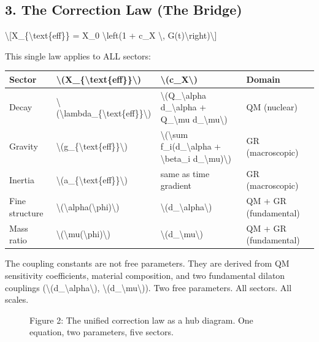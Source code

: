 \documentclass[
  10pt,
]{article}
\begin{document}
\hypertarget{the-correction-law-the-bridge}{%
\subsection{3. The Correction Law (The
Bridge)}\label{the-correction-law-the-bridge}}

\textbackslash{[}X\_\{\textbackslash text\{eff\}\} = X\_0
\textbackslash left(1 + c\_X \textbackslash,
G(t)\textbackslash right)\textbackslash{]}

This single law applies to ALL sectors:

\begin{longtable}[]{@{}llll@{}}
\toprule\noalign{}
Sector & \textbackslash(X\_\{\textbackslash text\{eff\}\}\textbackslash)
& \textbackslash(c\_X\textbackslash) & Domain \\
\midrule\noalign{}
\endhead
\bottomrule\noalign{}
\endlastfoot
Decay &
\textbackslash(\textbackslash lambda\_\{\textbackslash text\{eff\}\}\textbackslash)
& \textbackslash(Q\_\textbackslash alpha d\_\textbackslash alpha +
Q\_\textbackslash mu d\_\textbackslash mu\textbackslash) & QM
(nuclear) \\
Gravity &
\textbackslash(g\_\{\textbackslash text\{eff\}\}\textbackslash) &
\textbackslash(\textbackslash sum f\_i(d\_\textbackslash alpha +
\textbackslash beta\_i d\_\textbackslash mu)\textbackslash) & GR
(macroscopic) \\
Inertia &
\textbackslash(a\_\{\textbackslash text\{eff\}\}\textbackslash) & same
as time gradient & GR (macroscopic) \\
Fine structure &
\textbackslash(\textbackslash alpha(\textbackslash phi)\textbackslash) &
\textbackslash(d\_\textbackslash alpha\textbackslash) & QM + GR
(fundamental) \\
Mass ratio &
\textbackslash(\textbackslash mu(\textbackslash phi)\textbackslash) &
\textbackslash(d\_\textbackslash mu\textbackslash) & QM + GR
(fundamental) \\
\end{longtable}

The coupling constants are not free parameters. They are derived from QM
sensitivity coefficients, material composition, and two fundamental
dilaton couplings
(\textbackslash(d\_\textbackslash alpha\textbackslash),
\textbackslash(d\_\textbackslash mu\textbackslash)). Two free
parameters. All sectors. All scales.

\begin{figure}
\centering

\caption{Figure 2: The unified correction law as a hub diagram. One
equation, two parameters, five sectors.}
\end{figure}
\end{document}
